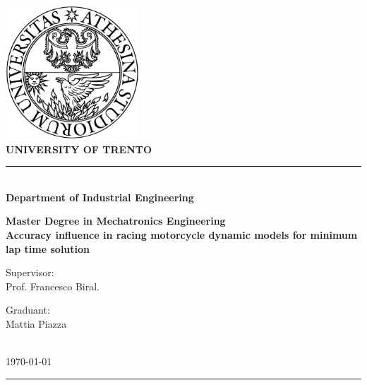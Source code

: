 \begin{titlepage}
\begin{center}
\includegraphics[width=5cm]{img/logo.png}\\[1cm]
{\LARGE \bfseries UNIVERSITY OF TRENTO \\[1cm]}


\rule{\linewidth}{0.3mm} \\[1cm]

{\LARGE \bfseries Department of Industrial Engineering\\[1cm]}

{ \Large \bfseries  Master Degree in Mechatronics Engineering\\[1.5cm] }
%
{ \Large \bfseries  Accuracy influence in racing motorcycle dynamic models for minimum lap time solution\\[2cm] }

\end{center}


\begin{minipage}{0.5\linewidth}
Supervisor:\\
Prof. Francesco Biral.
\end{minipage}%
\begin{minipage}{0.5\linewidth}
Graduant:\\
Mattia Piazza
\end{minipage}
\\[0.5cm]


\vfill
\today \\
\rule{\linewidth}{0.3mm} \\[0.5cm]
\end{titlepage}
%
\setcounter{page}{1}

\clearpage
\thispagestyle{empty}
\phantom{a}
\setcounter{page}{1}

